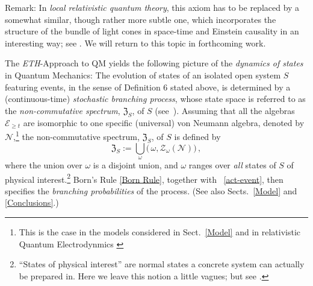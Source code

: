 \documentclass[12pt]{article}
\begin{document}
{Remark}: In \textit{local relativistic quantum theory}, this axiom has to be replaced by a somewhat similar, though
rather more subtle one, which incorporates the structure of the bundle of light cones in space-time and Einstein causality in an
interesting way; see \cite{Fr2}. We will return to this topic in forthcoming work.

The \textit{ETH}-Approach to QM yields the following picture of the \textit{dynamics of states} in Quantum Mechanics:
The evolution of states of an isolated open system $S$ featuring events, in the sense of Definition 6 stated above,
is determined by a (continuous-time) \textit{stochastic branching process}, whose state space is referred to
as the {\em{non-commutative spectrum}}, $\mathfrak{Z}_{S}$, of $S$ (see~\cite{Fr1}). Assuming that all the algebras
$\mathcal{E}_{\geq t}$ are isomorphic to one specific (universal) von Neumann algebra, denoted by $\mathcal{N}$,\footnote{This is the case in the models considered in Sect.~\ref{Model} and in relativistic Quantum Electrodynmics  \cite{Buchholz}} the non-commutative spectrum, $\mathfrak{Z}_{S}$, of $S$ is defined by
\begin{equation}\label{NCspect}
\mathfrak{Z}_{S}:= \bigcup_{\omega} \Big(\,\omega, \mathcal{Z}_{\omega}(\mathcal{N})\Big)\,,
\end{equation}
where the union over $\omega$ is a disjoint union, and $\omega$ ranges over \textit{all} states of $S$ of physical interest.\footnote{``States of physical interest'' are normal states a concrete system can actually be prepared in. Here we leave this notion a little vagues; but see \cite{Haag, Fr-Schub}.}
Born's Rule \eqref{Born Rule}, together with ~\eqref{act-event}, then specifies the \textit{branching probabilities}
of the process. (See also Sects.~\ref{Model} and \ref{Conclusions}.)\\
\end{document}

